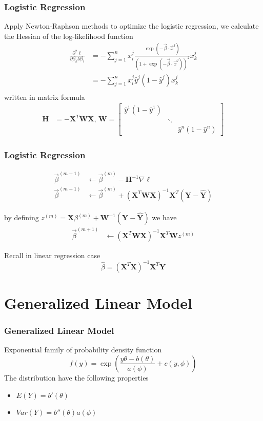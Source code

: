 \documentclass[notheorems, aspectratio=54]{beamer}
\begin{document}
\begin{frame}

\frametitle{Logistic Regression}
Apply Newton-Raphson methods to optimize the logistic regression, we calculate the Hessian of the log-likelihood function
\begin{align*}
\frac{\partial^2\ell}{\partial\beta_k\partial\beta_i}
&=-\sum_{j=1}^{n}x_i^j\frac{\exp(-\vec{\beta}\cdot\vec{x}^j)}{(1+\exp(-\vec{\beta}\cdot\vec{x}^j))^2}x_k^j\\
&=-\sum_{j=1}^{n}x_i^j \hat{y}^j (1-\hat{y}^j)x_k^j\\
\end{align*}
written in matrix formula
\begin{align*}
\textbf{H}&=-\textbf{X}^T\textbf{W}\textbf{X}\text{, } 
\textbf{W}=  \begin{bmatrix}
    \hat{y}^1 (1-\hat{y}^1) & & \\
    & \ddots & \\
    & & \hat{y}^n (1-\hat{y}^n)
  \end{bmatrix}
\end{align*}
\end{frame}

\begin{frame}
\frametitle{Logistic Regression}
\begin{align*}
\vec{\beta}^{(m+1)} &\leftarrow \vec{\beta}^{(m)}-\textbf{H}^{-1}\nabla\ell\\
\vec{\beta}^{(m+1)} &\leftarrow \vec{\beta}^{(m)}+(\textbf{X}^T\textbf{W}\textbf{X})^{-1}\textbf{X}^T(\textbf{Y}-\hat{\textbf{Y}})
\end{align*}

by defining  $z^{(m)}=\textbf{X}{\beta}^{(m)}+\textbf{W}^{-1}(\textbf{Y}-\hat{\textbf{Y}})$ we have
\begin{align*}
\vec{\beta}^{(m+1)} &\leftarrow (\textbf{X}^T\textbf{W}\textbf{X})^{-1}\textbf{X}^T\textbf{W}z^{(m)}
\end{align*}

Recall in linear regression case
$$\hat{\beta}=(\mathbf{X}^T\mathbf{X})^{-1}\mathbf{X}^{T}\mathbf{Y}$$
\end{frame}

\section{Generalized Linear Model}

\begin{frame}
\frametitle{Generalized Linear Model}
Exponential family of probability density function
$$
f(y)=\exp\left( \frac{y\theta-b(\theta)}{a(\phi)}+c(y, \phi)\right)
$$
The distribution have the following properties
\begin{itemize}
\item $E(Y)=b'(\theta)$
\item $Var(Y)=b''(\theta)a(\phi)$
\end{itemize}
\end{frame}
\end{document}
